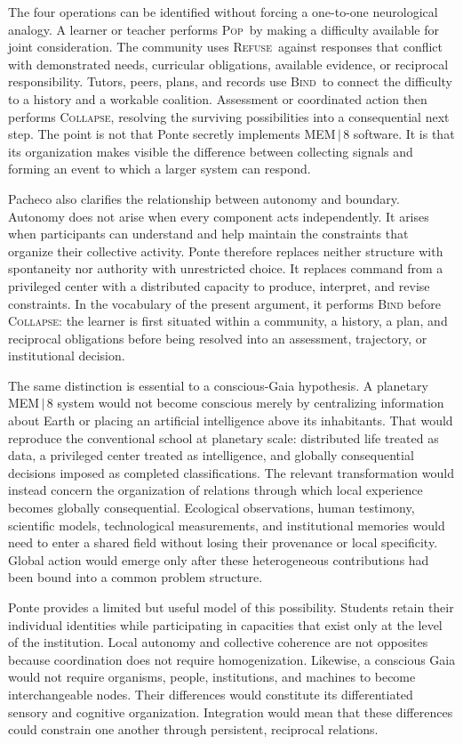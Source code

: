 \documentclass[11pt]{article}
\newcommand{\Pop}{\textsc{Pop}}
\newcommand{\Refuse}{\textsc{Refuse}}
\newcommand{\Bind}{\textsc{Bind}}
\newcommand{\Collapse}{\textsc{Collapse}}
\begin{document}
The four operations can be identified without forcing a one-to-one neurological analogy. A learner or teacher performs \Pop\ by making a difficulty available for joint consideration. The community uses \Refuse\ against responses that conflict with demonstrated needs, curricular obligations, available evidence, or reciprocal responsibility. Tutors, peers, plans, and records use \Bind\ to connect the difficulty to a history and a workable coalition. Assessment or coordinated action then performs \Collapse, resolving the surviving possibilities into a consequential next step. The point is not that Ponte secretly implements MEM\,$|$\,8 software. It is that its organization makes visible the difference between collecting signals and forming an event to which a larger system can respond.

Pacheco also clarifies the relationship between autonomy and boundary. Autonomy does not arise when every component acts independently. It arises when participants can understand and help maintain the constraints that organize their collective activity. Ponte therefore replaces neither structure with spontaneity nor authority with unrestricted choice. It replaces command from a privileged center with a distributed capacity to produce, interpret, and revise constraints. In the vocabulary of the present argument, it performs \textsc{Bind} before \textsc{Collapse}: the learner is first situated within a community, a history, a plan, and reciprocal obligations before being resolved into an assessment, trajectory, or institutional decision.

The same distinction is essential to a conscious-Gaia hypothesis. A planetary MEM\,$|$\,8 system would not become conscious merely by centralizing information about Earth or placing an artificial intelligence above its inhabitants. That would reproduce the conventional school at planetary scale: distributed life treated as data, a privileged center treated as intelligence, and globally consequential decisions imposed as completed classifications. The relevant transformation would instead concern the organization of relations through which local experience becomes globally consequential. Ecological observations, human testimony, scientific models, technological measurements, and institutional memories would need to enter a shared field without losing their provenance or local specificity. Global action would emerge only after these heterogeneous contributions had been bound into a common problem structure.

Ponte provides a limited but useful model of this possibility. Students retain their individual identities while participating in capacities that exist only at the level of the institution. Local autonomy and collective coherence are not opposites because coordination does not require homogenization. Likewise, a conscious Gaia would not require organisms, people, institutions, and machines to become interchangeable nodes. Their differences would constitute its differentiated sensory and cognitive organization. Integration would mean that these differences could constrain one another through persistent, reciprocal relations.
\end{document}
